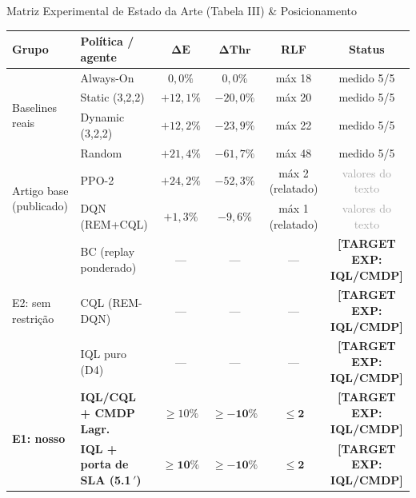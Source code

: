 \documentclass[aspectratio=169,10pt,xcolor={dvipsnames,table}]{beamer}
\newcommand{\targetexp}[1]{{\color{targetblue}\textbf{[TARGET EXP: #1]}}}
\begin{document}
\begin{frame}{Matriz Experimental de Estado da Arte (Tabela III) \& Posicionamento}
  \begin{table}
    \centering\scriptsize
    \setlength{\tabcolsep}{3.2pt}
    \renewcommand{\arraystretch}{1.1}
    \begin{tabular}{@{}llcccc@{}}
      \toprule
      \textbf{Grupo} & \textbf{Política / agente} & $\boldsymbol{\Delta E}$ &
      $\boldsymbol{\Delta\text{Thr}}$ & \textbf{RLF} & \textbf{Status} \\
      \midrule
      \multirow{4}{*}{Baselines reais} & Always-On & $0{,}0\%$ & $0{,}0\%$ & máx 18 &
        \textcolor{okgreen}{medido 5/5} \\
       & Static (3,2,2) & $+12{,}1\%$ & $-20{,}0\%$ & máx 20 &
         \textcolor{okgreen}{medido 5/5} \\
       & Dynamic (3,2,2) & $+12{,}2\%$ & $-23{,}9\%$ & máx 22 &
         \textcolor{okgreen}{medido 5/5} \\
       & Random & $+21{,}4\%$ & $-61{,}7\%$ & máx 48 &
         \textcolor{okgreen}{medido 5/5} \\
      \midrule
      \multirow{2}{*}{Artigo base (publicado)} & PPO-2 & $+24{,}2\%$ & $-52{,}3\%$ & máx 2 (relatado) &
        \textcolor{darkgray}{valores do texto} \\
       & DQN (REM+CQL) & $+1{,}3\%$ & $-9{,}6\%$ & máx 1 (relatado) &
         \textcolor{darkgray}{valores do texto} \\
      \midrule
      \multirow{3}{*}{E2: sem restrição} & BC (replay ponderado) & --- & --- & --- &
        \targetexp{IQL/CMDP} \\
       & CQL (REM-DQN) & --- & --- & --- & \targetexp{IQL/CMDP} \\
       & IQL puro (D4) & --- & --- & --- & \targetexp{IQL/CMDP} \\
      \midrule
      \multirow{2}{*}{\textbf{E1: nosso}} & \textbf{IQL/CQL + CMDP Lagr.} &
        \textbf{$\ge 10\%$} & $\boldsymbol{\ge -10\%}$ & $\boldsymbol{\le 2}$ &
        \targetexp{IQL/CMDP} \\
       & \textbf{IQL + porta de SLA (5.1\,$'$)} & $\mathbf{\ge 10\%}$ &
         $\boldsymbol{\ge -10\%}$ & $\boldsymbol{\le 2}$ & \targetexp{IQL/CMDP} \\
      \bottomrule

\end{tabular}
\end{table}
\end{frame}
\end{document}
